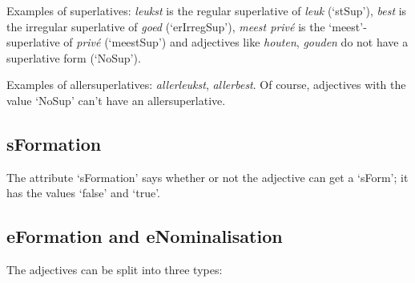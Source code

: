 Examples of superlatives: 
{\em leukst} is the regular superlative of {\em leuk} (`stSup'), 
{\em best} is the irregular superlative of {\em goed} (`erIrregSup'), 
{\em meest priv\'{e}} is the
`meest'-superlative of {\em priv\'{e}} (`meestSup') and adjectives like 
{\em houten}, {\em gouden} do not have a superlative form (`NoSup').

Examples of allersuperlatives: {\em allerleukst}, {\em allerbest}.
Of course, adjectives with the value `NoSup' can't have an allersuperlative.

\subsection{sFormation}

The attribute `sFormation' says whether or not the adjective can get a `sForm';
it has the values `false' and `true'.


\subsection{eFormation and eNominalisation}

The adjectives can be split into three types:

